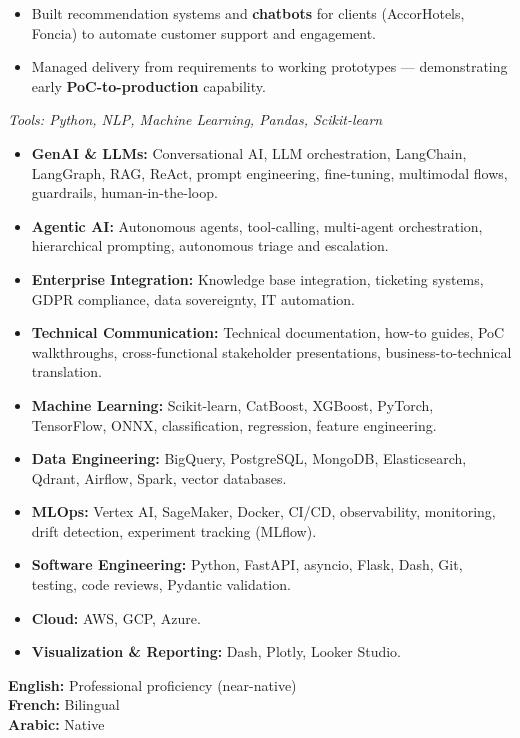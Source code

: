 \documentclass[10pt,a4paper]{altacv}
\begin{document}
\divider

\begin{itemize}
  \item Built recommendation systems and \textbf{chatbots} for clients (AccorHotels, Foncia) to automate customer support and engagement.
  \item Managed delivery from requirements to working prototypes — demonstrating early \textbf{PoC-to-production} capability.
\end{itemize}
\textit{Tools: Python, NLP, Machine Learning, Pandas, Scikit-learn}

\divider
{}

\begin{itemize}
  \item \textbf{GenAI \& LLMs:} Conversational AI, LLM orchestration, LangChain, LangGraph, RAG, ReAct, prompt engineering, fine-tuning, multimodal flows, guardrails, human-in-the-loop.
  \item \textbf{Agentic AI:} Autonomous agents, tool-calling, multi-agent orchestration, hierarchical prompting, autonomous triage and escalation.
  \item \textbf{Enterprise Integration:} Knowledge base integration, ticketing systems, GDPR compliance, data sovereignty, IT automation.
  \item \textbf{Technical Communication:} Technical documentation, how-to guides, PoC walkthroughs, cross-functional stakeholder presentations, business-to-technical translation.
  \item \textbf{Machine Learning:} Scikit-learn, CatBoost, XGBoost, PyTorch, TensorFlow, ONNX, classification, regression, feature engineering.
  \item \textbf{Data Engineering:} BigQuery, PostgreSQL, MongoDB, Elasticsearch, Qdrant, Airflow, Spark, vector databases.
  \item \textbf{MLOps:} Vertex AI, SageMaker, Docker, CI/CD, observability, monitoring, drift detection, experiment tracking (MLflow).
  \item \textbf{Software Engineering:} Python, FastAPI, asyncio, Flask, Dash, Git, testing, code reviews, Pydantic validation.
  \item \textbf{Cloud:} AWS, GCP, Azure.
  \item \textbf{Visualization \& Reporting:} Dash, Plotly, Looker Studio.
\end{itemize}

\textbf{English:} Professional proficiency (near-native) \\
\textbf{French:} Bilingual \\
\textbf{Arabic:} Native
\end{document}
